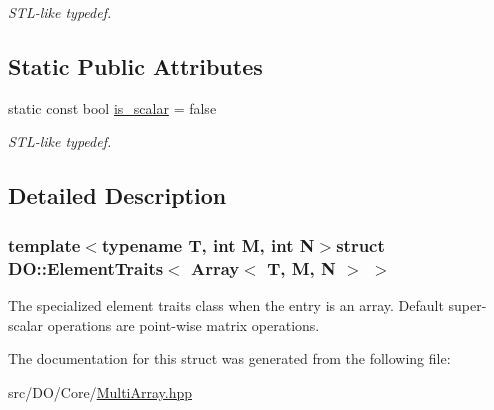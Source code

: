 \begin{DoxyCompactItemize}
\begin{DoxyCompactList}\small\item\em S\-T\-L-\/like typedef. \end{DoxyCompactList}\end{DoxyCompactItemize}
\subsection*{Static Public Attributes}
\begin{DoxyCompactItemize}
\item 
\hypertarget{struct_d_o_1_1_element_traits_3_01_array_3_01_t_00_01_m_00_01_n_01_4_01_4_a083611162fed7f6427026ec1d5cd6678}{static const bool \hyperlink{struct_d_o_1_1_element_traits_3_01_array_3_01_t_00_01_m_00_01_n_01_4_01_4_a083611162fed7f6427026ec1d5cd6678}{is\-\_\-scalar} = false}\label{struct_d_o_1_1_element_traits_3_01_array_3_01_t_00_01_m_00_01_n_01_4_01_4_a083611162fed7f6427026ec1d5cd6678}

\begin{DoxyCompactList}\small\item\em S\-T\-L-\/like typedef. \end{DoxyCompactList}\end{DoxyCompactItemize}


\subsection{Detailed Description}
\subsubsection*{template$<$typename T, int M, int N$>$struct D\-O\-::\-Element\-Traits$<$ Array$<$ T, M, N $>$ $>$}

The specialized element traits class when the entry is an array. Default super-\/scalar operations are point-\/wise matrix operations. 

The documentation for this struct was generated from the following file\-:\begin{DoxyCompactItemize}
\item 
src/\-D\-O/\-Core/\hyperlink{_multi_array_8hpp}{Multi\-Array.\-hpp}\end{DoxyCompactItemize}
